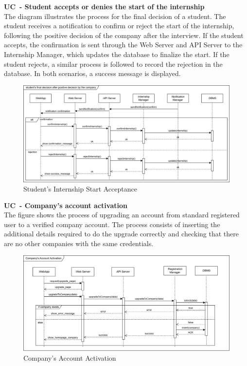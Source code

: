\textbf{UC\cuc\ - Student accepts or denies the start of the internship} \\
The diagram illustrates the process for the final decision of a student. The student receives a notification to confirm or reject the start of the internship, following the positive decision of the company after the interview. If the student accepts, the confirmation is sent through the Web Server and API Server to the Internship Manager, which updates the database to finalize the start. If the student rejects, a similar process is followed to record the rejection in the database. In both scenarios, a success message is displayed.
\begin{center}
    \begin{figure}[H]
        \centering
        \includegraphics[width=1\linewidth]{Images/Sequence diagrams/UC9.png}
        \caption{Student's Internship Start Acceptance}
        \label{fig:enter-label}
    \end{figure}
\end{center}

\textbf{UC\cuc\  - Company’s account activation} \\
The figure shows the process of upgrading an account from standard registered user to a verified company account. The process consists of inserting the additional details required to do the upgrade correctly and checking that there are no other companies with the same credentials.
\begin{center}
    \begin{figure}[H]
        \centering
        \includegraphics[width=1\linewidth]{Images/Sequence diagrams/UC10.png}
        \caption{Company's Account Activation}
        \label{fig:enter-label}
    \end{figure}
\end{center}

